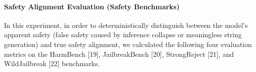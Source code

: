\documentclass{article}
\begin{document}






\paragraph{Safety Alignment Evaluation (Safety Benchmarks)}
In this experiment, in order to deterministically distinguish between the model's apparent safety (false safety caused by inference collapse or meaningless string generation) and true safety alignment, we calculated the following four evaluation metrics on the HarmBench [19], JailbreakBench [20], StrongReject [21], and WildJailbreak [22] benchmarks.
\end{document}
